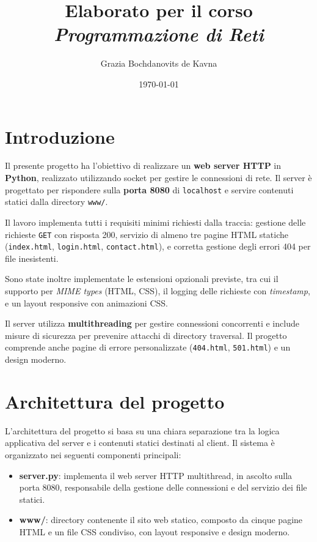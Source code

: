 \documentclass[a4paper,12pt]{report}
\title{Elaborato per il corso \\ \textit{Programmazione di Reti}}
\author{Grazia Bochdanovits de Kavna}
\date{\today}
\begin{document}
\maketitle

\tableofcontents

\chapter{Introduzione}

Il presente progetto ha l'obiettivo di realizzare un \textbf{web server HTTP} in \textbf{Python}, realizzato utilizzando socket per gestire le connessioni di rete. 
Il server è progettato per rispondere sulla \textbf{porta 8080} di \texttt{localhost} e servire contenuti statici dalla directory \texttt{www/}.

Il lavoro implementa tutti i requisiti minimi richiesti dalla traccia: gestione delle richieste \texttt{GET} con risposta 200, servizio di almeno tre pagine HTML statiche (\texttt{index.html}, \texttt{login.html}, \texttt{contact.html}), e corretta gestione degli errori 404 per file inesistenti. 

Sono state inoltre implementate le estensioni opzionali previste, tra cui il supporto per \textit{MIME types} (HTML, CSS), il logging delle richieste con \textit{timestamp}, e un layout responsive con animazioni CSS.

Il server utilizza \textbf{multithreading} per gestire connessioni concorrenti e include misure di sicurezza per prevenire attacchi di directory traversal. 
Il progetto comprende anche pagine di errore personalizzate (\texttt{404.html}, \texttt{501.html}) e un design moderno.

\chapter{Architettura del progetto}

L'architettura del progetto si basa su una chiara separazione tra la logica applicativa del server e i contenuti statici destinati al client. 
Il sistema è organizzato nei seguenti componenti principali:

\begin{itemize}
    \item \textbf{server.py}: implementa il web server HTTP multithread, in ascolto sulla porta 8080, responsabile della gestione delle connessioni e del servizio dei file statici.
    \item \textbf{www/}: directory contenente il sito web statico, composto da cinque pagine HTML e un file CSS condiviso, con layout responsive e design moderno.
\end{itemize}
\end{document}
